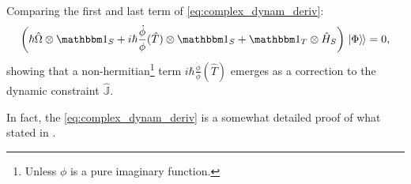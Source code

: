 Comparing the first and last term of \eqref{eq:complex_dynam_deriv}:
\begin{equation}
  \qty(
    \hbar\hat{\Omega} \ox \idop_S +
    i \hbar \frac{\dot{\phi}}{\phi} (\hat{T}) \ox \idop_S +
    \idop_T \ox \hat{H}_S
  ) \dket{\Phi} = 0
  \text{,}
\end{equation}
showing that a non-hermitian\footnote{
  Unless $\phi$  is a pure imaginary function.
}
term
$i \hbar \frac{\dot{\phi}}{\phi} (\hat{T})$
emerges as a correction to the dynamic constraint $\hat{\mathbb{J}}$.

In fact, the \eqref{eq:complex_dynam_deriv}
is a somewhat detailed proof of what stated in
\cite[eq. 27]{Lloyd:Time}.